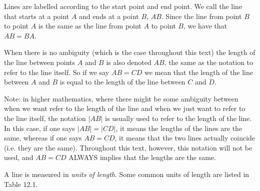       \label{m39370*id313170}Lines are labelled according to the start point and end point. We call the line that starts at a point $A$ and ends at a point $B$, $AB$. Since the line from point $B$ to point $A$ is the same as the line from point $A$ to point $B$, we have that $AB=BA$.\par 
      \label{m39370*id313175}When there is no ambiguity (which is the case throughout this text) the length of the line between points $A$ and $B$ is also denoted $AB$\hspace{1ex}, the same as the notation to refer to the line itself. So if we say $AB=CD$\hspace{1ex} we mean that the length of the line between $A$ and $B$ is equal to the length of the line between $C$ and $D$.
\par 
      \label{m39370*eip-313}Note: in higher mathematics, where there might be some ambiguity between when we want refer to the length of the line and when we just want to refer to the line itself, the notation $|AB|$\hspace{1ex} is usually used to refer to the length of the line. In this case, if one says $|AB|=|CD|$, it means the lengths of the lines are the same, whereas if one says $AB=CD$, it means that the two lines actually coincide (i.e. they are the same). Throughout this text, however, this notation will not be used, and $AB=CD$ ALWAYS implies that the lengths are the same. \par \label{m39370*id314000}A line is measured in \textsl{units of length}. Some common units of length are listed in Table 12.1.\par 

